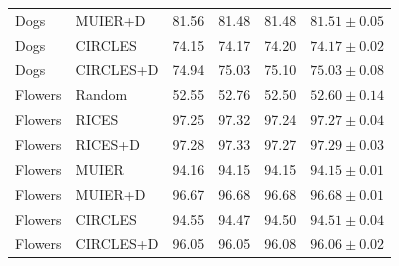 \begin{tabular}{llrrrr}
Dogs & MUIER+D & 81.56 & 81.48 & 81.48 & $81.51 \pm 0.05$ \\
Dogs & CIRCLES & 74.15 & 74.17 & 74.20 & $74.17 \pm 0.02$ \\
Dogs & CIRCLES+D & 74.94 & 75.03 & 75.10 & $75.03 \pm 0.08$ \\
Flowers & Random & 52.55 & 52.76 & 52.50 & $52.60 \pm 0.14$ \\
Flowers & RICES & 97.25 & 97.32 & 97.24 & $97.27 \pm 0.04$ \\
Flowers & RICES+D & 97.28 & 97.33 & 97.27 & $97.29 \pm 0.03$ \\
Flowers & MUIER & 94.16 & 94.15 & 94.15 & $94.15 \pm 0.01$ \\
Flowers & MUIER+D & 96.67 & 96.68 & 96.68 & $96.68 \pm 0.01$ \\
Flowers & CIRCLES & 94.55 & 94.47 & 94.50 & $94.51 \pm 0.04$ \\
Flowers & CIRCLES+D & 96.05 & 96.05 & 96.08 & $96.06 \pm 0.02$ \\
\bottomrule
\end{tabular}
